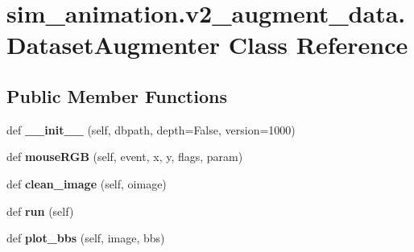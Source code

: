 \hypertarget{classsim__animation_1_1v2__augment__data_1_1DatasetAugmenter}{}\section{sim\+\_\+animation.\+v2\+\_\+augment\+\_\+data.\+Dataset\+Augmenter Class Reference}
\label{classsim__animation_1_1v2__augment__data_1_1DatasetAugmenter}
\subsection*{Public Member Functions}
\begin{DoxyCompactItemize}
\item 
\mbox{\label{classsim__animation_1_1v2__augment__data_1_1DatasetAugmenter_aa57aff32a4c3181f272fcbadfc538d76}} 
def {\bfseries \+\_\+\+\_\+init\+\_\+\+\_\+} (self, dbpath, depth=False, version=1000)
\item 
\mbox{\label{classsim__animation_1_1v2__augment__data_1_1DatasetAugmenter_ab9e1ec55500693b8b342e47d29fb1cbd}} 
def {\bfseries mouse\+R\+GB} (self, event, x, y, flags, param)
\item 
\mbox{\label{classsim__animation_1_1v2__augment__data_1_1DatasetAugmenter_a9db9236d8e0b6e918fef4c318433a20d}} 
def {\bfseries clean\+\_\+image} (self, oimage)
\item 
\mbox{\label{classsim__animation_1_1v2__augment__data_1_1DatasetAugmenter_a99134c33005de7f498e7432c4cd3ff2b}} 
def {\bfseries run} (self)
\item 
\mbox{\label{classsim__animation_1_1v2__augment__data_1_1DatasetAugmenter_a463a04bcf88731ccfa8169440d90cc2a}} 
def {\bfseries plot\+\_\+bbs} (self, image, bbs)
\end{DoxyCompactItemize}
